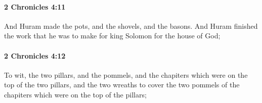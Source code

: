 		\paragraph{2 Chronicles 4:11} %
			\label{2CHRONICLES-4-11}

			And Huram made the pots, and the shovels, and the basons. And Huram finished the work that he was to make for king Solomon for the house of God;


		\paragraph{2 Chronicles 4:12} %
			\label{2CHRONICLES-4-12}

			To wit, the two pillars, and the pommels, and the chapiters which were on the top of the two pillars, and the two wreaths to cover the two pommels of the chapiters which were on the top of the pillars;

